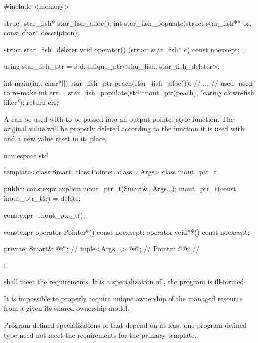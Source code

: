 \pnum
\begin{example}
\begin{codeblock}
#include <memory>

struct star_fish* star_fish_alloc();
int star_fish_populate(struct star_fish** ps, const char* description);

struct star_fish_deleter {
  void operator() (struct star_fish* c) const noexcept;
};

using star_fish_ptr = std::unique_ptr<star_fish, star_fish_deleter>;

int main(int, char*[]) {
  star_fish_ptr peach(star_fish_alloc());
  // ...
  // used, need to re-make
  int err = star_fish_populate(std::inout_ptr(peach), "caring clown-fish liker");
  return err;
}
\end{codeblock}
A  can be used with 
to be passed into an output pointer-style function.
The original value will be properly deleted
according to the function it is used with and
a new value reset in its place.
\end{example}

%
\begin{codeblock}
namespace std {
  template<class Smart, class Pointer, class... Args>
  class inout_ptr_t {
  public:
    constexpr explicit inout_ptr_t(Smart&, Args...);
    inout_ptr_t(const inout_ptr_t&) = delete;

    constexpr ~inout_ptr_t();

    constexpr operator Pointer*() const noexcept;
    operator void**() const noexcept;

  private:
    Smart& @@;                   // \expos
    tuple<Args...> @@;           // \expos
    Pointer @@;                  // \expos
  };
}
\end{codeblock}

\pnum
{} shall meet the  requirements.
If  is a specialization of ,
the program is ill-formed.
\begin{note}
It is impossible to properly acquire unique ownership of the managed resource
from a  given its shared ownership model.
\end{note}

\pnum
Program-defined specializations of 
that depend on at least one program-defined type
need not meet the requirements for the primary template.

